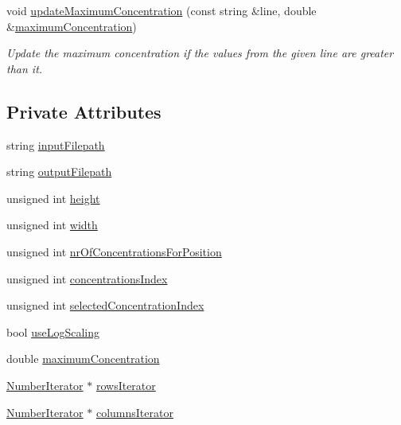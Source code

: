 \begin{DoxyCompactItemize}
void \hyperlink{classmultiscale_1_1video_1_1RectangularCsvToInputFilesConverter_ae93b5df92dd2bd02c04fde5b85c3ea75}{update\-Maximum\-Concentration} (const string \&line, double \&\hyperlink{classmultiscale_1_1video_1_1RectangularCsvToInputFilesConverter_aeddcdf92c6f79bf41546fd417d0808b1}{maximum\-Concentration})
\begin{DoxyCompactList}\small\item\em \-Update the maximum concentration if the values from the given line are greater than it. \end{DoxyCompactList}\end{DoxyCompactItemize}
\subsection*{\-Private \-Attributes}
\begin{DoxyCompactItemize}
\item 
string \hyperlink{classmultiscale_1_1video_1_1RectangularCsvToInputFilesConverter_a407e3c2607f036d531445e22454a910e}{input\-Filepath}
\item 
string \hyperlink{classmultiscale_1_1video_1_1RectangularCsvToInputFilesConverter_a2bb6a802fac9b0928bc53a8c71a1c33c}{output\-Filepath}
\item 
unsigned int \hyperlink{classmultiscale_1_1video_1_1RectangularCsvToInputFilesConverter_a766bc7eea1c602f46a4a6c0948464c8a}{height}
\item 
unsigned int \hyperlink{classmultiscale_1_1video_1_1RectangularCsvToInputFilesConverter_a7fe7f3d014535567fbeb465eb01cde1b}{width}
\item 
unsigned int \hyperlink{classmultiscale_1_1video_1_1RectangularCsvToInputFilesConverter_a0bfea1eb0f7dc76deee05af1e2eb744b}{nr\-Of\-Concentrations\-For\-Position}
\item 
unsigned int \hyperlink{classmultiscale_1_1video_1_1RectangularCsvToInputFilesConverter_a48b31e858d0ebac757af77703202634f}{concentrations\-Index}
\item 
unsigned int \hyperlink{classmultiscale_1_1video_1_1RectangularCsvToInputFilesConverter_a5143d25a98a097107c2bed748b4d8df0}{selected\-Concentration\-Index}
\item 
bool \hyperlink{classmultiscale_1_1video_1_1RectangularCsvToInputFilesConverter_a7739ee04a9340d981896861904022f26}{use\-Log\-Scaling}
\item 
double \hyperlink{classmultiscale_1_1video_1_1RectangularCsvToInputFilesConverter_aeddcdf92c6f79bf41546fd417d0808b1}{maximum\-Concentration}
\item 
\hyperlink{classmultiscale_1_1NumberIterator}{\-Number\-Iterator} $\ast$ \hyperlink{classmultiscale_1_1video_1_1RectangularCsvToInputFilesConverter_a19fa13140bc5d6b163222030b6dfe61e}{rows\-Iterator}
\item 
\hyperlink{classmultiscale_1_1NumberIterator}{\-Number\-Iterator} $\ast$ \hyperlink{classmultiscale_1_1video_1_1RectangularCsvToInputFilesConverter_aeeee251d65b8c189a72d08f3c70a94be}{columns\-Iterator}
\end{DoxyCompactItemize}

